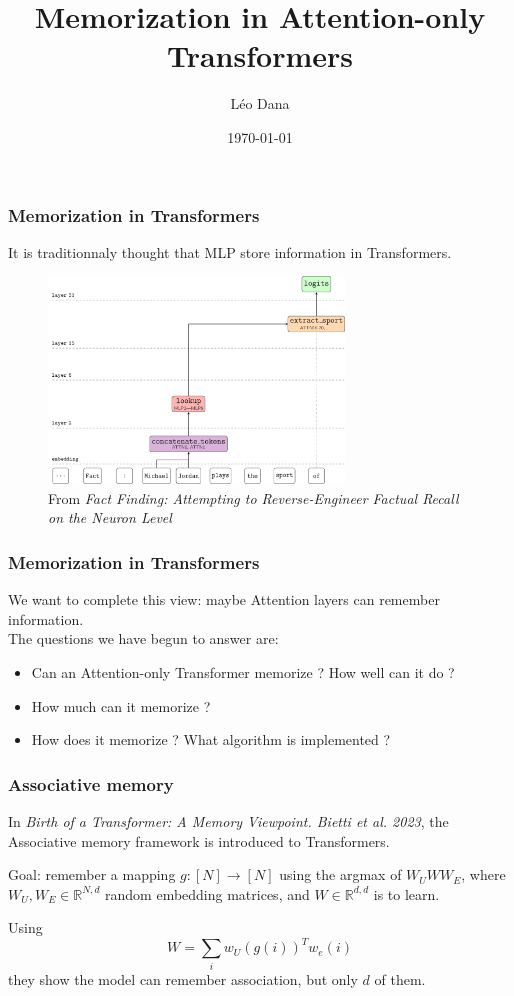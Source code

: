 \documentclass{beamer}
\title{Memorization in Attention-only Transformers}
\author{Léo Dana}
\date{\today}
\begin{document}
\begin{frame}
    \titlepage
\end{frame}

\begin{frame}
    \frametitle{Memorization in Transformers}
    It is traditionnaly thought that MLP store information in Transformers.
    \begin{figure}
        \includegraphics[width=0.7\textwidth]{./Look_up_table.png}
        \caption{From \textit{Fact Finding: Attempting to Reverse-Engineer Factual Recall on the Neuron Level}}
    \end{figure} 
\end{frame}

\begin{frame}
    \frametitle{Memorization in Transformers}
    We want to complete this view: maybe Attention layers can remember information. \\
    The questions we have begun to answer are:
    \begin{itemize}
        \item Can an Attention-only Transformer memorize ? How well can it do ?
        \item How much can it memorize ?
        \item How does it memorize ? What algorithm is implemented ?
    \end{itemize}
\end{frame}

\begin{frame}
    \frametitle{Associative memory}
    In \textit{Birth of a Transformer: A Memory Viewpoint. Bietti et al. 2023}, the Associative memory framework is introduced to Transformers.
    \break
    
    Goal: remember a mapping $g:[N]\rightarrow[N]$ using the argmax of $W_UWW_E$, where $W_U, W_E\in\mathbb{R}^{N,d}$ random embedding matrices,
    and $W\in\mathbb{R}^{d,d}$ is to learn.
    \break

    Using \[W = \sum_i w_U(g(i))^Tw_e(i)\] they show the model can remember association, but only $d$ of them.
\end{frame}
\end{document}
